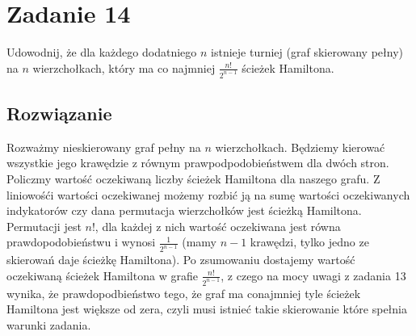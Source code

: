 \section{Zadanie 14}

Udowodnij, że dla każdego dodatniego \(n\) istnieje turniej (graf skierowany
pełny) na \(n\) wierzchołkach, który ma co najmniej \(\frac{n!}{2^{n-1}}\) ścieżek Hamiltona.

\subsection*{Rozwiązanie}

Rozważmy nieskierowany graf pełny na \(n\) wierzchołkach. Będziemy kierować wszystkie jego krawędzie z równym prawpodpodobieństwem dla dwóch stron. Policzmy wartość oczekiwaną liczby ścieżek Hamiltona dla naszego grafu. Z liniowośći wartości oczekiwanej możemy rozbić ją na sumę wartości oczekiwanych indykatorów czy dana permutacja wierzchołków jest ścieżką Hamiltona. Permutacji jest \(n!\), dla każdej z nich wartość oczekiwana jest równa prawdopodobieństwu i wynosi \(\frac{1}{2^{n-1}}\) (mamy \(n-1\) krawędzi, tylko jedno ze skierowań daje ścieżkę Hamiltona). Po zsumowaniu dostajemy wartość oczekiwaną ścieżek Hamiltona w grafie \(\frac{n!}{2^{n-1}}\), z czego na mocy uwagi z zadania 13 wynika, że prawdopodbieństwo tego, że graf ma conajmniej tyle ścieżek Hamiltona jest większe od zera, czyli musi istnieć takie skierowanie które spełnia warunki zadania.